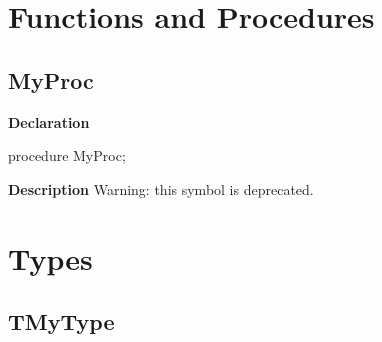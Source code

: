 \documentclass{report}
\newif\ifpdf
\begin{document}
\section{Functions and Procedures}
\ifpdf
\subsection*{\large{\textbf{MyProc}}\normalsize\hspace{1ex}\hrulefill}
\else
\subsection*{MyProc}
\fi
\label{ok_deprecated_tag-MyProc}
\begin{list}{}{
\setlength{\itemindent}{0cm}
\setlength{\listparindent}{0cm}
\setlength{\leftmargin}{\evensidemargin}
\addtolength{\leftmargin}{\tmplength}
\settowidth{\labelsep}{X}
\addtolength{\leftmargin}{\labelsep}
\setlength{\labelwidth}{\tmplength}
}
\item[\textbf{Declaration}\hfill]
\ifpdf
\begin{flushleft}
\fi
\begin{ttfamily}
procedure MyProc;\end{ttfamily}

\ifpdf
\end{flushleft}
\fi

\par
\item[\textbf{Description}]
Warning: this symbol is deprecated.

 

\end{list}
\section{Types}
\ifpdf
\subsection*{\large{\textbf{TMyType}}\normalsize\hspace{1ex}\hrulefill}
\else
\end{document}
